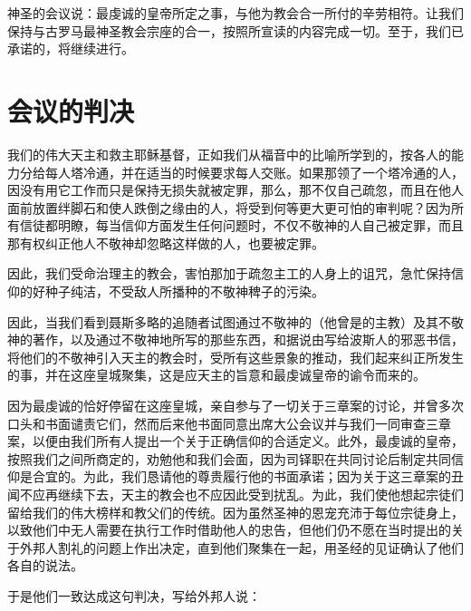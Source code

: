 神圣的会议说：最虔诚的皇帝所定之事，与他为教会合一所付的辛劳相符。让我们保持与古罗马最神圣教会宗座的合一，按照所宣读的内容完成一切。至于，我们已承诺的，将继续进行。\par


\section{会议的判决}

我们的伟大天主和救主耶稣基督，正如我们从福音中的比喻所学到的，按各人的能力分给每人塔冷通，并在适当的时候要求每人交账。如果那领了一个塔冷通的人，因没有用它工作而只是保持无损失就被定罪，那么，那不仅自己疏忽，而且在他人面前放置绊脚石和使人跌倒之缘由的人，将受到何等更大更可怕的审判呢？因为所有信徒都明瞭，每当信仰方面发生任何问题时，不仅不敬神的人自己被定罪，而且那有权纠正他人不敬神却忽略这样做的人，也要被定罪。\par

因此，我们受命治理主的教会，害怕那加于疏忽主工的人身上的诅咒，急忙保持信仰的好种子纯洁，不受敌人所播种的不敬神稗子的污染。\par

因此，当我们看到聂斯多略的追随者试图通过不敬神的（他曾是的主教）及其不敬神的著作，以及通过不敬神地所写的那些东西，和据说由写给波斯人的邪恶书信，将他们的不敬神引入天主的教会时，受所有这些景象的推动，我们起来纠正所发生的事，并在这座皇城聚集，这是应天主的旨意和最虔诚皇帝的谕令而来的。\par

因为最虔诚的恰好停留在这座皇城，亲自参与了一切关于三章案的讨论，并曾多次口头和书面谴责它们，然而后来他书面同意出席大公会议并与我们一同审查三章案，以便由我们所有人提出一个关于正确信仰的合适定义。此外，最虔诚的皇帝，按照我们之间所商定的，劝勉他和我们会面，因为司铎职在共同讨论后制定共同信仰是合宜的。为此，我们恳请他的尊贵履行他的书面承诺；因为关于这三章案的丑闻不应再继续下去，天主的教会也不应因此受到扰乱。为此，我们使他想起宗徒们留给我们的伟大榜样和教父们的传统。因为虽然圣神的恩宠充沛于每位宗徒身上，以致他们中无人需要在执行工作时借助他人的忠告，但他们仍不愿在当时提出的关于外邦人割礼的问题上作出决定，直到他们聚集在一起，用圣经的见证确认了他们各自的说法。\par

于是他们一致达成这句判决，写给外邦人说：\par

